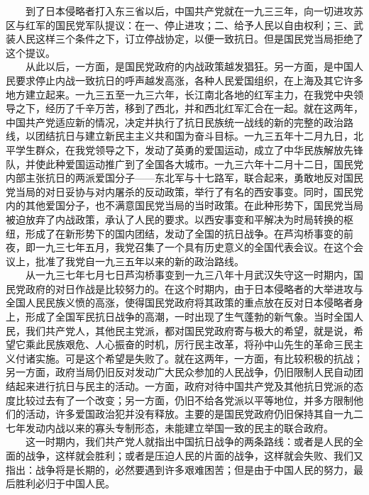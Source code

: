 \documentclass[cn,11pt,chinese]{elegantbook}
\begin{document}
　　到了日本侵略者打入东三省以后，中国共产党就在一九三三年，向一切进攻苏区与红军的国民党军队提议：在一、停止进攻；二、给予人民以自由权利；三、武装人民这样三个条件之下，订立停战协定，以便一致抗日。但是国民党当局拒绝了这个提议。\\
　　从此以后，一方面，是国民党政府的内战政策越发猖狂。另一方面，是中国人民要求停止内战一致抗日的呼声越发高涨，各种人民爱国组织，在上海及其它许多地方建立起来。一九三五至一九三六年，长江南北各地的红军主力，在我党中央领导之下，经历了千辛万苦，移到了西北，并和西北红军汇合在一起。就在这两年，中国共产党适应新的情况，决定并执行了抗日民族统一战线的新的完整的政治路线，以团结抗日与建立新民主主义共和国为奋斗目标。一九三五年十二月九日，北平学生群众，在我党领导之下，发动了英勇的爱国运动，成立了中华民族解放先锋队，并使此种爱国运动推广到了全国各大城市。一九三六年十二月十二日，国民党内部主张抗日的两派爱国分子——东北军与十七路军，联合起来，勇敢地反对国民党当局的对日妥协与对内屠杀的反动政策，举行了有名的西安事变。同时，国民党内的其他爱国分子，也不满意国民党当局的当时政策。在此种形势下，国民党当局被迫放弃了内战政策，承认了人民的要求。以西安事变和平解决为时局转换的枢纽，形成了在新形势下的国内团结，发动了全国的抗日战争。在芦沟桥事变的前夜，即一九三七年五月，我党召集了一个具有历史意义的全国代表会议。在这个会议上，批准了我党自一九三五年以来的新的政治路线。\\
　　从一九三七年七月七日芦沟桥事变到一九三八年十月武汉失守这一时期内，国民党政府的对日作战是比较努力的。在这个时期内，由于日本侵略者的大举进攻与全国人民民族义愤的高涨，使得国民党政府将其政策的重点放在反对日本侵略者身上，形成了全国军民抗日战争的高潮，一时出现了生气蓬勃的新气象。当时全国人民，我们共产党人，其他民主党派，都对国民党政府寄与极大的希望，就是说，希望它乘此民族艰危、人心振奋的时机，厉行民主改革，将孙中山先生的革命三民主义付诸实施。可是这个希望是失败了。就在这两年，一方面，有比较积极的抗战；另一方面，政府当局仍旧反对发动广大民众参加的人民战争，仍旧限制人民自动团结起来进行抗日与民主的活动。一方面，政府对待中国共产党及其他抗日党派的态度比较过去有了一个改变；另一方面，仍旧不给各党派以平等地位，并多方限制他们的活动，许多爱国政治犯并没有释放。主要的是国民党政府仍旧保持其自一九二七年发动内战以来的寡头专制形态，未能建立举国一致的民主的联合政府。\\
　　这一时期内，我们共产党人就指出中国抗日战争的两条路线：或者是人民的全面的战争，这样就会胜利；或者是压迫人民的片面的战争，这样就会失败、我们又指出：战争将是长期的，必然要遇到许多艰难困苦；但是由于中国人民的努力，最后胜利必归于中国人民。\\
\end{document}
